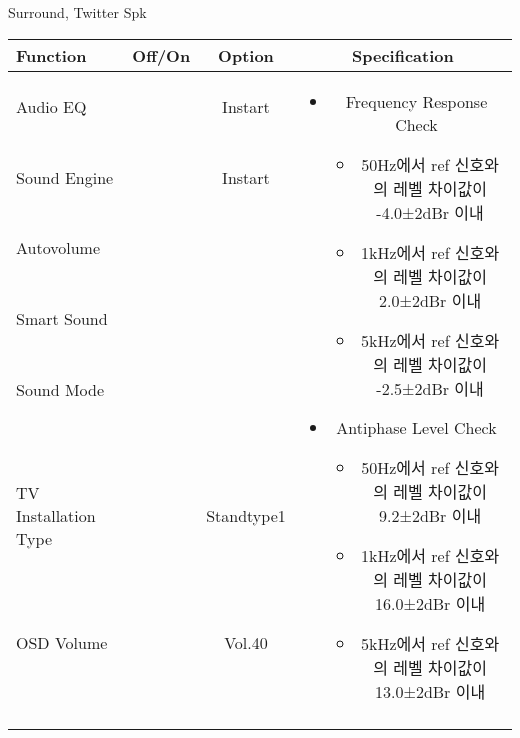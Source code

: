 \begin{frame}[t]{Surround, Twitter Spk}
\begin{tiny}
\begin{tabular}{@{}lccc@{}}
\toprule
Function & Off/On & Option & Specification \\
\midrule
Audio EQ & \color{black}{Off} & Instart &
\multirow{10}{60mm}{
\begin{itemize}
	\vspace{-3mm}
	\item Frequency Response Check
	\begin{itemize}
		\item 50Hz에서 ref 신호와의 레벨 차이값이 -4.0±2dBr 이내
		\item 1kHz에서 ref 신호와의 레벨 차이값이 2.0±2dBr 이내
		\item 5kHz에서 ref 신호와의 레벨 차이값이 -2.5±2dBr 이내
	\end{itemize}
	\item Antiphase Level Check
	\begin{itemize}
		\item 50Hz에서 ref 신호와의 레벨 차이값이 9.2±2dBr 이내
		\item 1kHz에서 ref 신호와의 레벨 차이값이 16.0±2dBr 이내
		\item 5kHz에서 ref 신호와의 레벨 차이값이 13.0±2dBr 이내
	\end{itemize}
\end{itemize}
} \\
Sound Engine & \color{blue}{On} & Instart & \\
Autovolume & \color{black}{Off} & & \\
Smart Sound & \color{black}{Off} & & \\
Sound Mode & \color{blue}{On} & \color{blue}{Surround} & \\
TV Installation Type & \color{blue}{On} & Standtype1 & \\
OSD Volume & \color{blue}{On} & Vol.40 & \\
& & & \\
& & & \\
& & & \\
& & & \\
\midrule
\end{tabular}
\end{tiny}


\end{frame}
